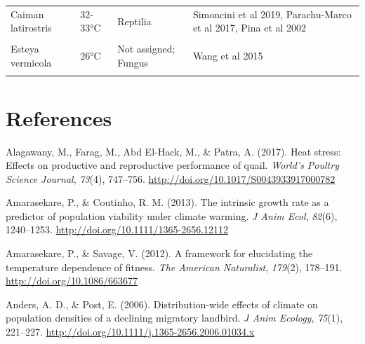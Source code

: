 \documentclass[12pt,twoside]{reedthesis}
\begin{document}
\begin{table}[!h]
\begin{tabular}[t]{>{\raggedright\arraybackslash}p{3cm}ll>{\raggedright\arraybackslash}p{3cm}}
Caiman latirostris & 32-33°C & Reptilia & Simoncini et al 2019, Parachu-Marco et al 2017, Pina et al 2002\\
\cellcolor{gray!6}{Trachemys scripta} & \cellcolor{gray!6}{32-33°C} & \cellcolor{gray!6}{Reptilia} & \cellcolor{gray!6}{Dang et al 2019}\\
\addlinespace
Esteya vermicola & 26°C & Not assigned; Fungus & Wang et al 2015\\
\cellcolor{gray!6}{Xylotrechus arvicola} & \cellcolor{gray!6}{N/A} & \cellcolor{gray!6}{Insecta} & \cellcolor{gray!6}{Garcia-Ruiz et al 2011}\\
\bottomrule
\end{tabular}
\end{table}
\backmatter

\hypertarget{references}{%
\chapter*{References}\label{references}}


\noindent

\setlength{\parindent}{-0.20in}
\setlength{\leftskip}{0.20in}
\setlength{\parskip}{8pt}

\hypertarget{refs}{}
\leavevmode\hypertarget{ref-alagawany_heat_2017}{}%
Alagawany, M., Farag, M., Abd El-Hack, M., \& Patra, A. (2017). Heat stress: Effects on productive and reproductive performance of quail. \emph{World's Poultry Science Journal}, \emph{73}(4), 747--756. \url{http://doi.org/10.1017/S0043933917000782}

\leavevmode\hypertarget{ref-amarasekare_intrinsic_2013}{}%
Amarasekare, P., \& Coutinho, R. M. (2013). The intrinsic growth rate as a predictor of population viability under climate warming. \emph{J Anim Ecol}, \emph{82}(6), 1240--1253. \url{http://doi.org/10.1111/1365-2656.12112}

\leavevmode\hypertarget{ref-amarasekare_framework_2012}{}%
Amarasekare, P., \& Savage, V. (2012). A framework for elucidating the temperature dependence of fitness. \emph{The American Naturalist}, \emph{179}(2), 178--191. \url{http://doi.org/10.1086/663677}

\leavevmode\hypertarget{ref-anders_distribution-wide_2006}{}%
Anders, A. D., \& Post, E. (2006). Distribution-wide effects of climate on population densities of a declining migratory landbird. \emph{J Anim Ecology}, \emph{75}(1), 221--227. \url{http://doi.org/10.1111/j.1365-2656.2006.01034.x}
\end{document}
